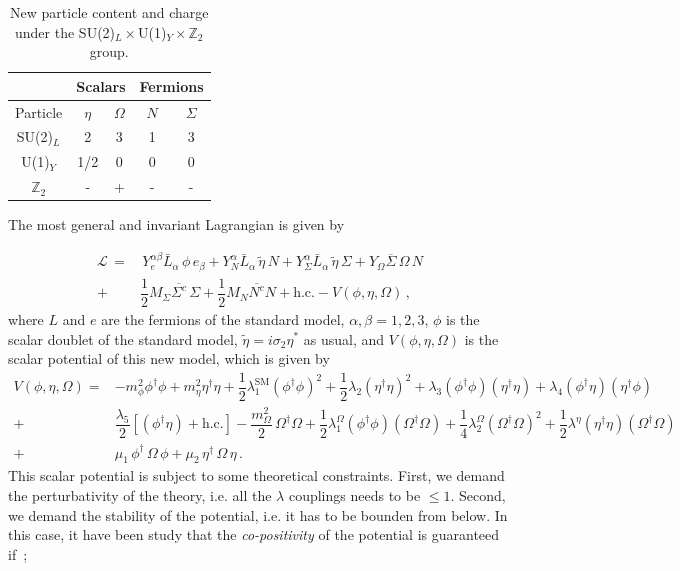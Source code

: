 \documentclass[12pt,letterpaper]{article}
\begin{document}
   
\begin{table}
\centering
\begin{tabular}{|c|c|c|c|c|}
\hline
 \multicolumn{1}{|c}{   }  &
 \multicolumn{2}{|c}{ Scalars  } &
  \multicolumn{2}{|c|}{ Fermions  }  \\
 \hline 
Particle & $\eta$ & $\Omega$ & $N$ & $\Sigma$\\
\hline
SU(2)$_L$ &2 &3 &1 &3\\
U(1)$_Y$ &1/2 &0 &0 &0\\
$\mathbb{Z}_2$ & - &+ &- &-\\
\hline
\end{tabular}
\caption{New particle content and charge under the SU(2)$_L\times
$U(1)$_Y\times\mathbb{Z}_2$ group.}
\label{tab:new-particle-content}
\end{table}


The most general and invariant Lagrangian is given by

\begin{align}
\label{eq:full-lagrangian}
\mathcal{L}\, = &\, Y_e^{\alpha\beta}\bar{L}_{\alpha}\,\phi\, e_{\beta}
+  Y_N^{\alpha}\bar{L}_{\alpha}\,\tilde{\eta}\, N 
+  Y_{\Sigma}^{\alpha}\bar{L}_{\alpha}\,\tilde{\eta}\, \Sigma 
+  Y_{\Omega}\overline{\Sigma}\,\Omega\, N\nonumber \\
+& \dfrac{1}{2}M_{\Sigma}\overline{\Sigma^c}\,\Sigma
+ \dfrac{1}{2}M_{N}\overline{N^c}N + \text{h.c.} - V(\phi,\eta, \Omega)\,,
\end{align}
%
where $L$ and $e$ are the fermions of the standard model, $\alpha,\beta=1,2,3$, $\phi$ is the scalar doublet of the standard model, $\tilde{\eta}=i\sigma_2\eta^*$ as usual, and $V(\phi,\eta, \Omega)$ is the scalar potential of this new model, which is given by
%
\begin{align}
\label{eq:scalar-potential}
V(\phi,\eta, \Omega) = &
-m_{\phi}^2 \phi^{\dagger}\phi + m_{\eta}^2 \eta^{\dagger}\eta
+\dfrac{1}{2}\lambda_1^{\text{SM}} (\phi^{\dagger}\phi)^2
+\dfrac{1}{2}\lambda_2 (\eta^{\dagger}\eta)^2
+\lambda_3 (\phi^{\dagger}\phi)(\eta^{\dagger}\eta)
+\lambda_4 (\phi^{\dagger}\eta)(\eta^{\dagger}\phi) \nonumber \\
+& \dfrac{\lambda_5}{2}\left[(\phi^{\dagger}\eta) + \text{h.c.}\right]
-\dfrac{m_{\Omega}^2}{2}\,\Omega^{\dagger}\Omega
+\dfrac{1}{2}\lambda_1^{\Omega} (\phi^{\dagger}\phi)(\Omega^{\dagger}\Omega)
+\dfrac{1}{4}\lambda_2^{\Omega} (\Omega^{\dagger}\Omega)^2
+\dfrac{1}{2}\lambda^{\eta} (\eta^{\dagger}\eta)(\Omega^{\dagger}\Omega)\nonumber \\
+& \mu_1\,\phi^{\dagger}\,\Omega\,\phi + \mu_2\,\eta^{\dagger}\,\Omega\,\eta\,.
\end{align}
%
This scalar potential is subject to some theoretical constraints. First, we demand the perturbativity of the theory, i.e. all the $\lambda$ couplings needs to be $\leq 1$. Second, we demand the stability of the potential, i.e. it has to be bounden from below. In this case, it have been study that the \textit{co-positivity} of the potential is guaranteed if~\cite{Merle:2016scw};
\end{document}
